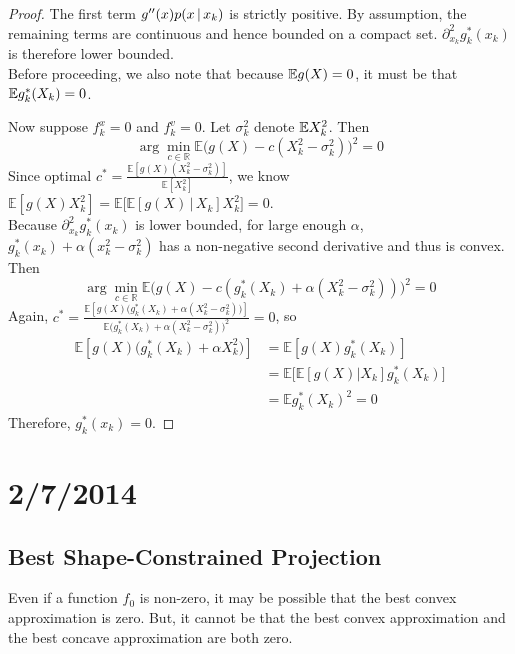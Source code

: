 \documentclass{article}
\begin{document}
{\begin{proof}
The first term $g''(x) p(x \,|\, x_k)$ is strictly positive. By assumption, the remaining terms are continuous and hence bounded on a compact set. $\partial^2_{x_k} g^*_k(x_k)$ is therefore lower bounded.\\

Before proceeding, we also note that because $\mathbb{E} g(X) = 0$, it must be that $\mathbb{E} g^*_k(X_k) = 0$.

Now suppose $f^x_k = 0$ and $f^v_k = 0$. Let $\sigma_k^2$ denote $\mathbb{E} X_k^2$. Then 
\[
\arg\min_{c \in \mathbb{R}} \mathbb{E}\Big( g(X) - c (X_k^2-\sigma_k^2) \Big)^2 = 0
\]
Since optimal $c^* = \frac{\mathbb{E} [ g(X) (X_k^2-\sigma_k^2) ]}{\mathbb{E}[ X_k^2 ]}$, 
we know $\mathbb{E} [ g(X) X_k^2 ] = 
\mathbb{E} \Big[ \mathbb{E}[ g(X) \,|\, X_k] X_k^2 \Big] = 0$.\\

Because $\partial^2_{x_k} g^*_k(x_k)$ is lower bounded, for large enough $\alpha$, $g^*_k(x_k) + \alpha (x_k^2 - \sigma_k^2)$ has a non-negative second derivative and thus is convex. Then
\[
\arg\min_{c \in \mathbb{R}} \mathbb{E}\Big( g(X) 
       - c (g^*_k(X_k) + \alpha (X_k^2 - \sigma_k^2)) \Big)^2 = 0
\]
Again, $c^* = \frac{\mathbb{E}[g(X)\big( 
            g^*_k(X_k) + \alpha (X_k^2 - \sigma_k^2) \big)]}{\mathbb{E}
        \big( g^*_k(X_k) + \alpha (X_k^2 - \sigma_k^2) \big)^2} = 0$, so
\begin{align*}
\mathbb{E}[ g(X) \big( g^*_k(X_k) + \alpha X_k^2 \big) ] &= 
\mathbb{E}[ g(X) g^*_k(X_k) ] \\
& = \mathbb{E}\Big[ \mathbb{E}[g(X) | X_k]  g^*_k(X_k) \Big] \\
& = \mathbb{E} g^*_k(X_k)^2 = 0
\end{align*}
Therefore, $g^*_k(x_k) = 0$.

\end{proof}


\newpage
\section{2/7/2014}

\subsection{Best Shape-Constrained Projection}

Even if a function $f_0$ is non-zero, it may be possible that the best convex approximation is zero. But, it cannot be that the best convex approximation and the best concave approximation are both zero.

}
\end{document}
